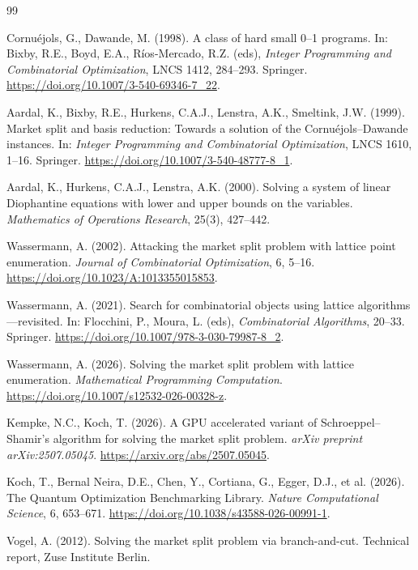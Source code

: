 \documentclass[11pt]{article}
\begin{document}
\begin{thebibliography}{99}

Cornu\'ejols, G., Dawande, M. (1998).
A class of hard small 0--1 programs.
In: Bixby, R.E., Boyd, E.A., R\'ios-Mercado, R.Z. (eds),
\emph{Integer Programming and Combinatorial Optimization}, LNCS 1412, 284--293.
Springer. \url{https://doi.org/10.1007/3-540-69346-7_22}.

Aardal, K., Bixby, R.E., Hurkens, C.A.J., Lenstra, A.K., Smeltink, J.W. (1999).
Market split and basis reduction: Towards a solution of the Cornu\'ejols--Dawande instances.
In: \emph{Integer Programming and Combinatorial Optimization}, LNCS 1610, 1--16.
Springer. \url{https://doi.org/10.1007/3-540-48777-8_1}.

Aardal, K., Hurkens, C.A.J., Lenstra, A.K. (2000).
Solving a system of linear Diophantine equations with lower and upper bounds on the variables.
\emph{Mathematics of Operations Research}, 25(3), 427--442.

Wassermann, A. (2002).
Attacking the market split problem with lattice point enumeration.
\emph{Journal of Combinatorial Optimization}, 6, 5--16.
\url{https://doi.org/10.1023/A:1013355015853}.

Wassermann, A. (2021).
Search for combinatorial objects using lattice algorithms---revisited.
In: Flocchini, P., Moura, L. (eds), \emph{Combinatorial Algorithms}, 20--33.
Springer. \url{https://doi.org/10.1007/978-3-030-79987-8_2}.

Wassermann, A. (2026).
Solving the market split problem with lattice enumeration.
\emph{Mathematical Programming Computation}.
\url{https://doi.org/10.1007/s12532-026-00328-z}.

Kempke, N.C., Koch, T. (2026).
A GPU accelerated variant of Schroeppel--Shamir's algorithm for solving the market split problem.
\emph{arXiv preprint arXiv:2507.05045}.
\url{https://arxiv.org/abs/2507.05045}.

Koch, T., Bernal Neira, D.E., Chen, Y., Cortiana, G., Egger, D.J., et al. (2026).
The Quantum Optimization Benchmarking Library.
\emph{Nature Computational Science}, 6, 653--671.
\url{https://doi.org/10.1038/s43588-026-00991-1}.

Vogel, A. (2012).
Solving the market split problem via branch-and-cut.
Technical report, Zuse Institute Berlin.


\end{thebibliography}
\end{document}
